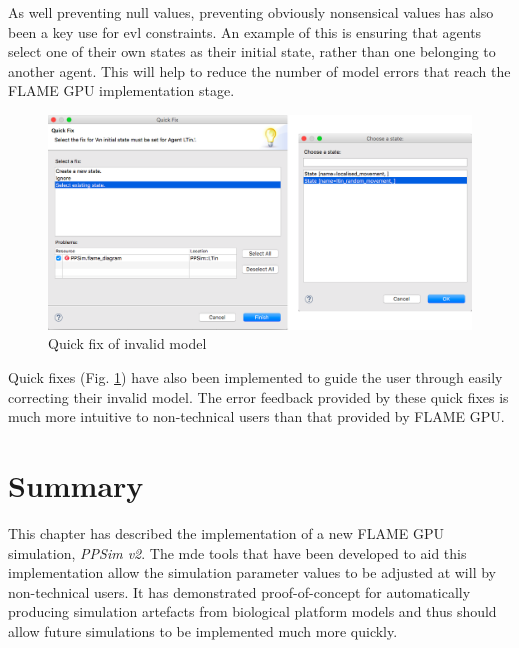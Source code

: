 \documentclass{UoYCSproject}
\begin{document}
As well preventing null values, preventing obviously nonsensical values has also been a key use for \gls{evl} constraints.
An example of this is ensuring that agents select one of their own states as their initial state, rather than one belonging to another agent.
This will help to reduce the number of model errors that reach the \gls{FLAME GPU} implementation stage.


\begin{figure}[htp]
\centering
\includegraphics[width=\textwidth]{Appendix/validation_quickfix_gmf}
\caption{Quick fix of invalid model}
\label{fig:validation_quickfix_gmf}
\end{figure}

Quick fixes (Fig. \ref{fig:validation_quickfix_gmf}) have also been implemented to guide the user through easily correcting their invalid model.
The error feedback provided by these quick fixes is much more intuitive to non-technical users than that provided by \gls{FLAME GPU}.

\section{Summary}
This chapter has described the implementation of a new \gls{FLAME GPU} simulation, \textit{PPSim v2}.
The \gls{mde} tools that have been developed to aid this implementation allow the simulation parameter values to be adjusted at will by non-technical users.
It has demonstrated proof-of-concept for automatically producing simulation artefacts from biological platform models and thus should allow future simulations to be implemented much more quickly.
\end{document}
